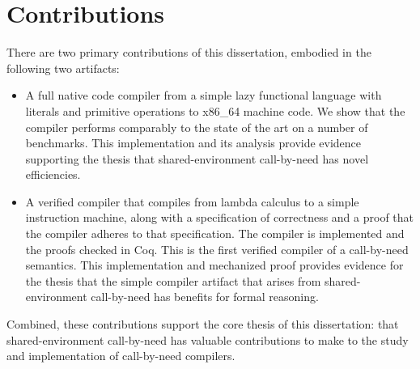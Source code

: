 \section{Contributions}

There are two primary contributions of this dissertation, embodied in the
following two artifacts:

\begin{itemize}
\item A full native code compiler from a simple lazy functional language with
literals and primitive operations to x86\_64 machine code. We show that the
compiler performs comparably to the state of the art on a number of benchmarks.
This implementation and its analysis provide evidence supporting the thesis that
shared-environment call-by-need has novel efficiencies.

\item A verified compiler that compiles from lambda calculus to a simple
instruction machine, along with a specification of correctness and a proof that
the compiler adheres to that specification. The compiler is implemented and the
proofs checked in Coq. This is the first verified compiler of a call-by-need
semantics. This implementation and mechanized proof provides evidence for the
thesis that the simple compiler artifact that arises from shared-environment
call-by-need has benefits for formal reasoning.
\end{itemize}

Combined, these contributions support the core thesis of this dissertation: that
shared-environment call-by-need has valuable contributions to make to the study
and implementation of call-by-need compilers.

